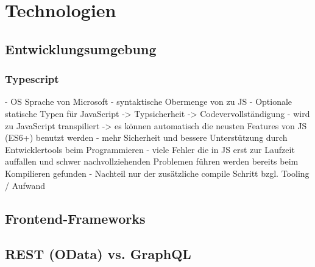 \chapter{Technologien}

\section{Entwicklungsumgebung} %
\subsection{Typescript}
- OS Sprache von Microsoft
- syntaktische Obermenge von zu JS
- Optionale statische Typen für JavaScript
   -> Typsicherheit
   -> Codevervollständigung 
- wird zu JavaScript transpiliert
   -> es können automatisch die neusten Features von JS (ES6+) benutzt werden 
- mehr Sicherheit und bessere Unterstützung durch Entwicklertools beim Programmieren
- viele Fehler die in JS erst zur Laufzeit auffallen und schwer nachvollziehenden Problemen führen werden bereits beim Kompilieren gefunden
- Nachteil nur der zusätzliche compile Schritt bzgl. Tooling / Aufwand




\section{Frontend-Frameworks}




\section{REST (OData) vs. GraphQL}
